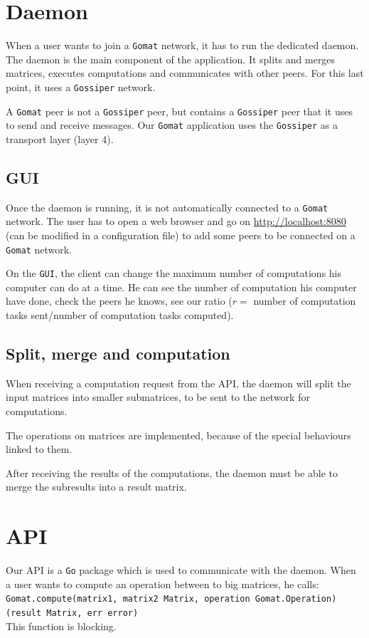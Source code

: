 \documentclass[a4paper,12pt]{article}
\newcommand{\Gossiper}{\texttt{Gossiper}\xspace}
\newcommand{\Gomat}{\texttt{Gomat}\xspace}
\newcommand{\Go}{\texttt{Go}\xspace}
\begin{document}
    \section{Daemon}
    When a user wants to join a \Gomat network, it has to run the dedicated daemon. The daemon is the main component of the application. It splits and merges matrices, executes computations and communicates with other peers. For this last point, it uses a \Gossiper network.

    A \Gomat peer is not a \Gossiper peer, but contains a \Gossiper peer that it uses to send and receive messages. Our \Gomat application uses the \Gossiper as a transport layer (layer 4).

    \subsection{GUI}
    Once the daemon is running, it is not automatically connected to a \Gomat network. The user has to open a web browser and go on \url{http://localhost:8080} (can be modified in a configuration file) to add some peers to be connected on a
    \Gomat network.
    
    On the \texttt{GUI}, the client can change the maximum number of computations his computer can do at a time. He can see
    the number of computation his computer have done, check the peers he knows, see our ratio
    ($r =$ number of computation tasks sent/{number of computation tasks computed}).
    
    \subsection{Split, merge and computation}
    When receiving a computation request from the API, the daemon will split the input matrices into smaller submatrices, to be sent to the network for computations.

	The operations on matrices are implemented, because of the special behaviours linked to them.

	After receiving the results of the computations, the daemon must be able to merge the subresults into a result matrix.

    \section{API}
    Our API is a \Go package which is used to communicate with the daemon. When a user wants to compute an operation between to big matrices, he calls:\\
    \texttt{Gomat.compute(matrix1, matrix2 Matrix, operation Gomat.Operation)(result Matrix, err error)}\\
    This function is blocking.
\end{document}
